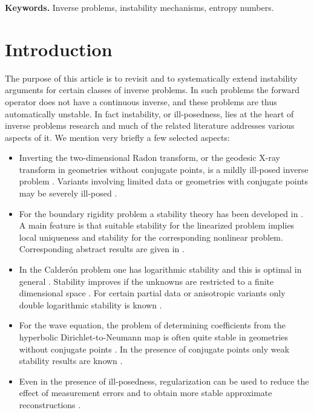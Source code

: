 \documentclass[12pt,twoside]{amsart}
\numberwithin{equation}{section}
\begin{document}
\noindent \textbf{Keywords.} Inverse problems, instability mechanisms, entropy numbers. 
\vspace{0.5cm}


\section{Introduction} \label{sec_introduction}

The purpose of this article is to revisit and to systematically extend instability arguments for certain classes of inverse problems. In such problems the forward operator does not have a continuous inverse, and these problems are thus automatically unstable. In fact instability, or ill-posedness, lies at the heart of inverse problems research and much of the related literature addresses various aspects of it. We mention very briefly a few selected aspects:

\begin{itemize}
\item 
Inverting the two-dimensional Radon transform, or the geodesic X-ray transform in geometries without conjugate points, is a mildly ill-posed inverse problem \cite{Natterer_book, AS20}. Variants involving limited data or geometries with conjugate points may be severely ill-posed \cite{Natterer_book, SU04, MSU15}.
\item 
For the boundary rigidity problem a stability theory has been developed in \cite{SU04, SU08}. A main feature is that suitable stability for the linearized problem implies local uniqueness and stability for the corresponding nonlinear problem. Corresponding abstract results are given in \cite{SU09}.
\item 
In the Calder\'on problem one has logarithmic stability \cite{Alessandrini} and this is optimal in general \cite{Mandache}. Stability improves if the unknowns are restricted to a finite dimensional space \cite{AlessandriniVessella}. For certain partial data or anisotropic variants only double logarithmic stability is known \cite{CaroSalo, CDR}.
\item 
For the wave equation, the problem of determining coefficients from the hyperbolic Dirichlet-to-Neumann map is often quite stable in geometries without conjugate points \cite{SU05, Montalto}. In the presence of conjugate points only weak stability results are known \cite{AKKLT, BKL}.
\item 
Even in the presence of ill-posedness, regularization can be used to reduce the effect of measurement errors and to obtain more stable approximate reconstructions \cite{EHN}.
\end{itemize}
\end{document}
